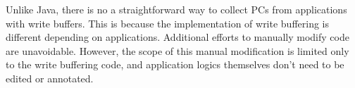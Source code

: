 Unlike Java, there is no a straightforward way to collect PCs from applications
with write buffers. This is because the implementation of write buffering is
different depending on applications. Additional efforts to manually modify code
are unavoidable. However, the scope of this manual modification is limited only
to the write buffering code, and application logics themselves don't need to be
edited or annotated.


